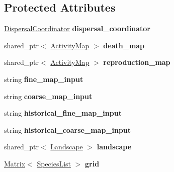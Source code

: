 \subsection*{Protected Attributes}
\begin{DoxyCompactItemize}
\item 
\hyperlink{class_dispersal_coordinator}{Dispersal\+Coordinator} {\bfseries dispersal\+\_\+coordinator}\hypertarget{class_spatial_tree_ad238e987bbf1cf2110bd6c3b980de3e4}{}\label{class_spatial_tree_ad238e987bbf1cf2110bd6c3b980de3e4}

\item 
shared\+\_\+ptr$<$ \hyperlink{class_activity_map}{Activity\+Map} $>$ {\bfseries death\+\_\+map}\hypertarget{class_spatial_tree_a6daf7de3a05f63777a0ad67f12bc7095}{}\label{class_spatial_tree_a6daf7de3a05f63777a0ad67f12bc7095}

\item 
shared\+\_\+ptr$<$ \hyperlink{class_activity_map}{Activity\+Map} $>$ {\bfseries reproduction\+\_\+map}\hypertarget{class_spatial_tree_ac9ec70e77ff7b1f67bc9aed6cb8749e1}{}\label{class_spatial_tree_ac9ec70e77ff7b1f67bc9aed6cb8749e1}

\item 
string {\bfseries fine\+\_\+map\+\_\+input}\hypertarget{class_spatial_tree_a44fdea35be7d4496248ee27c1457ad6a}{}\label{class_spatial_tree_a44fdea35be7d4496248ee27c1457ad6a}

\item 
string {\bfseries coarse\+\_\+map\+\_\+input}\hypertarget{class_spatial_tree_a464b674dbf6f2968497f698ad9a16433}{}\label{class_spatial_tree_a464b674dbf6f2968497f698ad9a16433}

\item 
string {\bfseries historical\+\_\+fine\+\_\+map\+\_\+input}\hypertarget{class_spatial_tree_ac49970522839ed06459949caca57fa1d}{}\label{class_spatial_tree_ac49970522839ed06459949caca57fa1d}

\item 
string {\bfseries historical\+\_\+coarse\+\_\+map\+\_\+input}\hypertarget{class_spatial_tree_a54279132ba3e8bc3455488bb3b16e8f8}{}\label{class_spatial_tree_a54279132ba3e8bc3455488bb3b16e8f8}

\item 
shared\+\_\+ptr$<$ \hyperlink{class_landscape}{Landscape} $>$ {\bfseries landscape}\hypertarget{class_spatial_tree_a0c081fddba637ed965c932bb6b8ee998}{}\label{class_spatial_tree_a0c081fddba637ed965c932bb6b8ee998}

\item 
\hyperlink{class_matrix}{Matrix}$<$ \hyperlink{class_species_list}{Species\+List} $>$ {\bfseries grid}\hypertarget{class_spatial_tree_a199167b149b25c506fdaeb660d595658}{}\label{class_spatial_tree_a199167b149b25c506fdaeb660d595658}


\end{DoxyCompactItemize}
